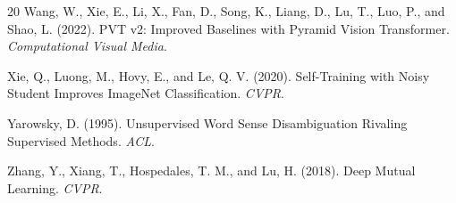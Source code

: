 \documentclass[a4paper]{article}
\begin{document}
\begin{thebibliography}{20}
Wang, W., Xie, E., Li, X., Fan, D., Song, K., Liang, D., Lu, T., Luo, P., and Shao, L. (2022).
PVT v2: Improved Baselines with Pyramid Vision Transformer.
\textit{Computational Visual Media}.

Xie, Q., Luong, M., Hovy, E., and Le, Q. V. (2020).
Self-Training with Noisy Student Improves ImageNet Classification.
\textit{CVPR}.

Yarowsky, D. (1995).
Unsupervised Word Sense Disambiguation Rivaling Supervised Methods.
\textit{ACL}.

Zhang, Y., Xiang, T., Hospedales, T. M., and Lu, H. (2018).
Deep Mutual Learning.
\textit{CVPR}.

\end{thebibliography}
\end{document}
